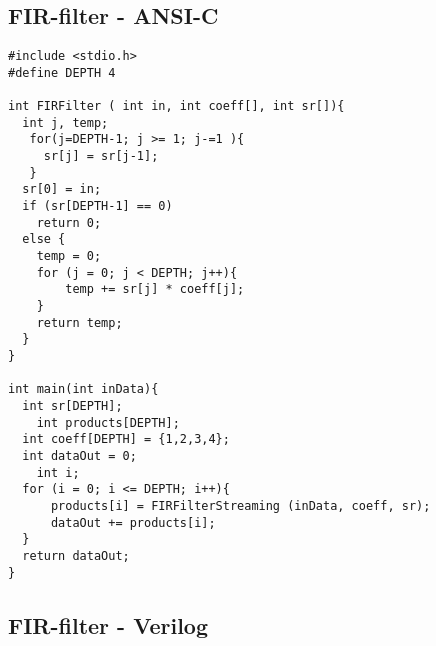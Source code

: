 \subsection{FIR-filter - ANSI-C}
\begin{lstlisting}[caption=FIR-filter implemented in C]
#include <stdio.h>
#define DEPTH 4

int FIRFilter ( int in, int coeff[], int sr[]){
  int j, temp;
   for(j=DEPTH-1; j >= 1; j-=1 ){
     sr[j] = sr[j-1];
   }
  sr[0] = in;
  if (sr[DEPTH-1] == 0)
    return 0;
  else {
    temp = 0;
    for (j = 0; j < DEPTH; j++){
        temp += sr[j] * coeff[j];
    }
    return temp;
  }
}

int main(int inData){
  int sr[DEPTH];
	int products[DEPTH];
  int coeff[DEPTH] = {1,2,3,4};
  int dataOut = 0;
	int i;
  for (i = 0; i <= DEPTH; i++){
      products[i] = FIRFilterStreaming (inData, coeff, sr);
      dataOut += products[i];
  }
  return dataOut;
}
\end{lstlisting}
\subsection{FIR-filter - Verilog}


